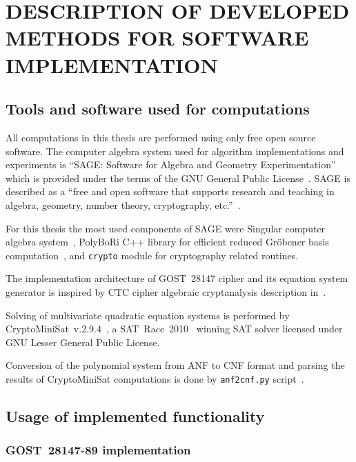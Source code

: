 % 

\chapter{DESCRIPTION OF DEVELOPED METHODS FOR SOFTWARE IMPLEMENTATION}
\label{sec:implementation}

\section{Tools and software used for computations}
\label{sec:soft-and-tools}

All computations in this thesis are performed using only free open source
software. The computer algebra system used for algorithm implementations and
experiments is ``SAGE: Software for Algebra and Geometry Experimentation''
which is provided under the terms of the GNU General Public
License~\cite{sage}. SAGE is described as a ``free and open software that
supports research and teaching in algebra, geometry, number theory,
cryptography, etc.''~\cite{sage-core}.

For this thesis the most used components of SAGE were Singular
computer algebra system~\cite{singular}, PolyBoRi C++ library for efficient
reduced Gr\"obener basis computation~\cite{polybori}, and \verb+crypto+ module for cryptography
related routines.

The implementation architecture of GOST~28147 cipher and its equation system
generator is inspired by CTC cipher algebraic cryptanalysis description
in~\cite{Albrecht2006}.

Solving of multivariate quadratic equation systems is performed by
\mbox{CryptoMiniSat~v.2.9.4}~\cite{soos:cryptominisat}, a SAT~Race~2010~\cite{satrace2010} winning SAT solver
licensed under GNU Lesser General Public License.

Conversion of the polynomial system from ANF to CNF format and parsing the
results of \mbox{CryptoMiniSat} computations is done by \verb+anf2cnf.py+
script~\cite{anf2cnf}.

\section{Usage of implemented functionality}
\label{sec:soft-usage}


\subsection{GOST~28147-89 implementation}
\label{sec:soft-gost}

